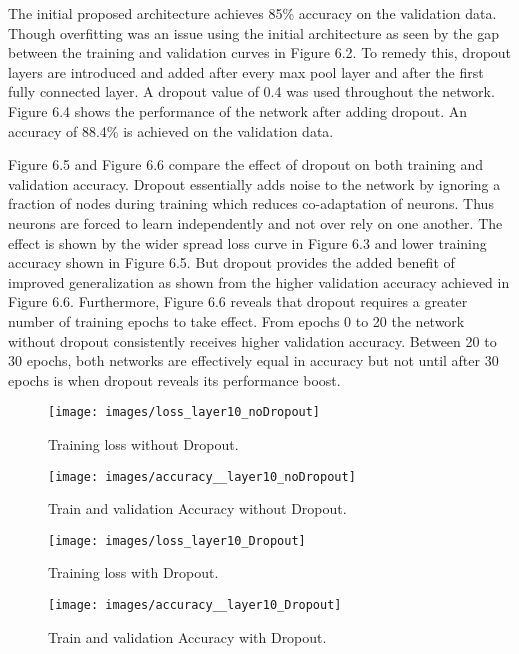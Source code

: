\documentclass[12pt]{report}
\begin{document}
The initial proposed architecture achieves 85\% accuracy on the validation data. Though overfitting was an issue using the initial architecture as seen by the gap between the training and validation curves in Figure 6.2. To remedy this, dropout \cite{dropout} layers are introduced and added after every max pool layer and after the first fully connected layer. A dropout value of 0.4 was used throughout the network.  Figure 6.4 shows the performance of the network after adding dropout.  An accuracy of 88.4\% is achieved on the validation data. 

Figure 6.5 and Figure 6.6 compare the effect of dropout on both training and validation accuracy. Dropout essentially adds noise to the network by ignoring a fraction of nodes during training which reduces co-adaptation of neurons. Thus neurons are forced to learn independently and not over rely on one another. The effect is shown by the wider spread loss curve in Figure 6.3 and lower training accuracy shown in Figure 6.5. But dropout provides the added benefit of improved generalization as shown from the higher validation accuracy achieved in Figure 6.6. Furthermore, Figure 6.6 reveals that dropout requires a greater number of training epochs to take effect. From epochs 0 to 20 the network without dropout consistently receives higher validation accuracy. Between 20 to 30 epochs, both networks are effectively equal in accuracy but not until after 30 epochs is when dropout reveals its performance boost.   


\begin{figure}[]
\centering
\texttt{[image: images/loss\_layer10\_noDropout]}
\vspace*{-2.1in}
\caption{Training loss without Dropout.}
\end{figure}

\begin{figure}[]
\centering
\texttt{[image: images/accuracy\_\_layer10\_noDropout]}
\caption{Train and validation Accuracy without Dropout.}
\end{figure}

\begin{figure}[]
\centering
\texttt{[image: images/loss\_layer10\_Dropout]}
\vspace*{-2.1in}
\caption{Training loss with Dropout.}
\end{figure}


\begin{figure}[]
\centering
\texttt{[image: images/accuracy\_\_layer10\_Dropout]}
\caption{Train and validation Accuracy with Dropout.}
\end{figure}
\end{document}
